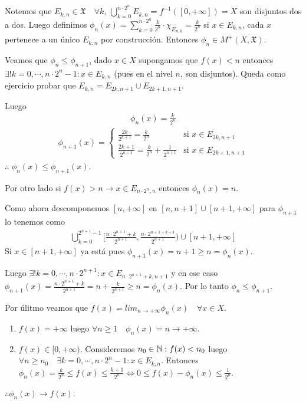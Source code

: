 Notemos que $E_{k, n} \in \mathfrak{X} \quad \forall k$, $\bigcup_{k = 0}^{n \cdot 2^n} E_{k, n} = f^{-1}([0, +\infty]) = X$ son disjuntos dos a dos.
Luego definimos $\phi_n(x) = \sum_{k = 0}^{n \cdot 2^n} \frac{k}{2^n} \cdot \chi_{E_{n, k}} = \frac{k}{2^n}$ si $x \in E_{k, n}$, cada $x$ pertenece a un único $E_{k, n}$ por construcción.
Entonces $\phi_n \in M^+(X ,\mathfrak{X})$.

Veamos que $\phi_n \leq \phi_{n+1}$, dado $x \in X$ supongamos que $f(x) < n$ entonces $\exists! k = 0, \cdots, n \cdot 2^n - 1 : x \in E_{k, n}$ (pues en el nivel $n$, son disjuntos).
Queda como ejercicio probar que $E_{k, n} = E_{2k, n+1} \cup E_{2k+1, n+1}$.

Luego
\begin{align*}
    \phi_n(x) = \frac{k}{2^n}
\end{align*}
\begin{align*}\phi_{n+1}(x) = \begin{cases}
                        \frac{2k}{2^{n+1}} = \frac{k}{2^n}                       & \text{si } x \in E_{2k, n+1}   \\
                        \frac{2k+1}{2^{n+1}} = \frac{k}{2^n} + \frac{1}{2^{n+1}} & \text{si } x \in E_{2k+1, n+1}
                    \end{cases}
\end{align*} $\therefore$ $\phi_n(x) \leq \phi_{n+1}(x)$.

Por otro lado si $f(x) > n \to x \in E_{n \cdot 2^n, n}$ entonces $\phi_n(x) = n$.

Como ahora descomponemos $[n, +\infty]$ en $[n, n+1] \cup [n+1, +\infty]$ para $\phi_{n+1}$ lo tenemos como \begin{align*}
    \bigcup_{k = 0}^{2^{n+1}-1} [ \frac{n \cdot 2^{n+1} + k}{2^{n+1}}, \frac{n \cdot 2^{n+1 + k+1}}{2^{n+1}} ) \cup [n+1, +\infty]
\end{align*}
Si $x \in [n+1, +\infty]$ ya está pues $\phi_{n+1}(x) = n+1 \geq n = \phi_n(x)$.

Luego $\exists ! k = 0, \cdots, n \cdot 2^{n+1} : x \in E_{n \cdot 2^{n+1}+k, n+1}$ y en ese caso
$\phi_{n+1}(x) = \frac{n \cdot 2^{n+1} + k}{2^{n+1}} = n + \frac{k}{2^{n+1}} \geq n = \phi_n(x)$.
Por lo tanto $\phi_n \leq \phi_{n+1}$.

Por úlitmo veamos que $f(x) = lim_{n \to +\infty} \phi_n(x) \quad \forall x \in X$.
\begin{enumerate}
    \item $f(x) = +\infty$ luego $\forall n \geq 1 \quad \phi_n(x) = n \to +\infty$.
    \item $f(x) \in [0, +\infty)$. Consideremos $n_0 \in \mathbb{N} : f(x) < n_0$ luego $\forall n \geq n_0 \quad \exists k = 0, \cdots, n \cdot 2^n - 1 : x \in E_{k, n}$.
          Entonces $\phi_n(x) = \frac{k}{2^n} \leq f(x) \leq \frac{k+1}{2^n} \iff 0 \leq f(x) - \phi_n(x) \leq \frac{1}{2^n}$.
\end{enumerate}
$\therefore \phi_n(x) \to f(x)$.

